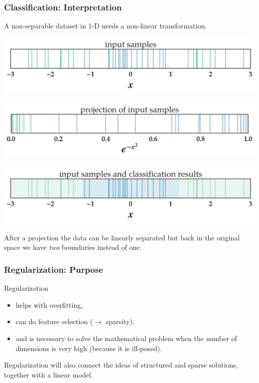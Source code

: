 \documentclass[11pt]{beamer}
\begin{document}
\begin{frame}
  \frametitle{Classification: Interpretation}
  A non-separable dataset in 1-D needs a non-linear transformation. 
  \begin{center}
    \includegraphics[scale=0.3]{figures/input_features.png}
  \end{center}
  \begin{center}
    \includegraphics[scale=0.3]{figures/projection.png}
  \end{center}
  \begin{center}
    \includegraphics[scale=0.3]{figures/prediction.png}
  \end{center}
  After a projection the data can be linearly separated but back in the original space we have
  \emph{two} boundaries instead of one.
\end{frame}
\begin{frame}
  \frametitle{Regularization: Purpose}
  Regularization
  \begin{itemize}
  \item helps with overfitting,
  \item can do feature selection ($\rightarrow$ sparsity),
  \item and is necessary to solve the mathematical problem when the number of
    dimensions is very high (because it is ill-posed).
  \end{itemize}
  Regularization will also connect the ideas of structured and sparse
  solutions, together with a linear model.
\end{frame}
\end{document}
